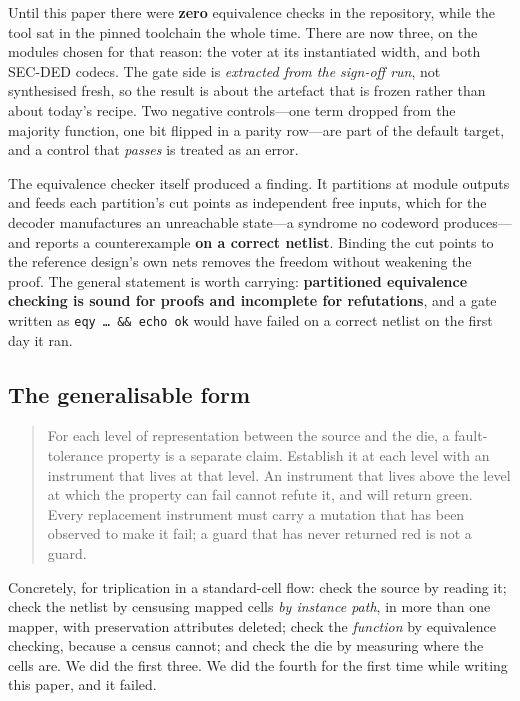 \documentclass[11pt,a4paper]{article}
\begin{document}
Until this paper there were \textbf{zero} equivalence checks in the
repository, while the tool sat in the pinned toolchain the whole time.
There are now three, on the modules chosen for that reason: the voter at
its instantiated width, and both SEC-DED codecs. The gate side is
\emph{extracted from the sign-off run}, not synthesised fresh, so the
result is about the artefact that is frozen rather than about today's
recipe. Two negative controls---one term dropped from the majority
function, one bit flipped in a parity row---are part of the default
target, and a control that \emph{passes} is treated as an error.

The equivalence checker itself produced a finding. It partitions at
module outputs and feeds each partition's cut points as independent free
inputs, which for the decoder manufactures an unreachable
state---a syndrome no codeword produces---and reports a counterexample
\textbf{on a correct netlist}. Binding the cut points to the reference
design's own nets removes the freedom without weakening the proof. The
general statement is worth carrying: \textbf{partitioned equivalence
checking is sound for proofs and incomplete for refutations}, and a gate
written as \texttt{eqy \ldots{} \&\& echo ok} would have failed on a
correct netlist on the first day it ran.

\subsection{The generalisable form}

\begin{quote}
For each level of representation between the source and the die, a
fault-tolerance property is a separate claim. Establish it at each level
with an instrument that lives at that level. An instrument that lives
above the level at which the property can fail cannot refute it, and will
return green. Every replacement instrument must carry a mutation that has
been observed to make it fail; a guard that has never returned red is not
a guard.
\end{quote}

Concretely, for triplication in a standard-cell flow: check the source by
reading it; check the netlist by censusing mapped cells \emph{by instance
path}, in more than one mapper, with preservation attributes deleted;
check the \emph{function} by equivalence checking, because a census
cannot; and check the die by measuring where the cells are. We did the
first three. We did the fourth for the first time while writing this
paper, and it failed.
\end{document}
